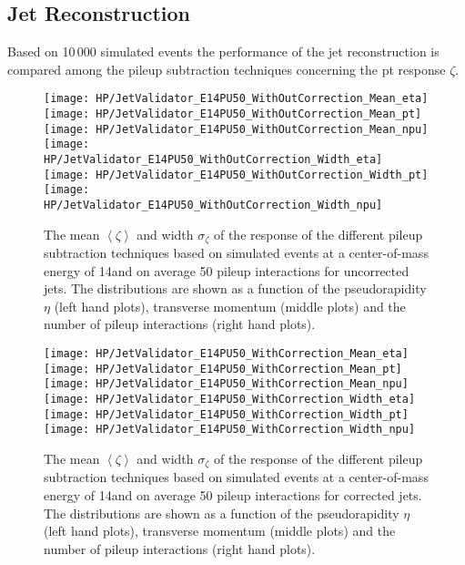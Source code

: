 \subsection{Jet Reconstruction \label{sec:HPUAppE14PU50JR}}

Based on 10\,000 simulated \ttbar events the performance of the jet reconstruction is compared among the pileup subtraction techniques concerning the pt response $\zeta$.

\begin{figure}[!h]
  \centering
  \texttt{[image: HP/JetValidator\_E14PU50\_WithOutCorrection\_Mean\_eta]}
  \texttt{[image: HP/JetValidator\_E14PU50\_WithOutCorrection\_Mean\_pt]}
  \texttt{[image: HP/JetValidator\_E14PU50\_WithOutCorrection\_Mean\_npu]}
  \\
  \centering
  \texttt{[image: HP/JetValidator\_E14PU50\_WithOutCorrection\_Width\_eta]}
  \texttt{[image: HP/JetValidator\_E14PU50\_WithOutCorrection\_Width\_pt]}
  \texttt{[image: HP/JetValidator\_E14PU50\_WithOutCorrection\_Width\_npu]}
  \caption[Mean and width of the \pt{} response for different pileup subtraction techniques based on simulated \ttbar events with 14\TeV and PU=50 for uncorrected jets]{The mean $\left<\zeta\right>$ and width $\sigma_{\zeta}$ of the \pt{} response of the  different pileup subtraction techniques based on simulated \ttbar events at a center-of-mass energy of 14\TeV and on average 50 pileup interactions for uncorrected jets. The distributions are shown as a function of the pseudorapidity $\eta$ (left hand plots), transverse momentum (middle plots) and the number of pileup interactions (right hand plots).}
\end{figure}

\begin{figure}[!h]
  \centering
  \texttt{[image: HP/JetValidator\_E14PU50\_WithCorrection\_Mean\_eta]}
  \texttt{[image: HP/JetValidator\_E14PU50\_WithCorrection\_Mean\_pt]}
  \texttt{[image: HP/JetValidator\_E14PU50\_WithCorrection\_Mean\_npu]}
  \\
  \centering
  \texttt{[image: HP/JetValidator\_E14PU50\_WithCorrection\_Width\_eta]}
  \texttt{[image: HP/JetValidator\_E14PU50\_WithCorrection\_Width\_pt]}
  \texttt{[image: HP/JetValidator\_E14PU50\_WithCorrection\_Width\_npu]}
  \caption[Mean and width of the \pt{} response for different pileup subtraction techniques based on simulated \ttbar events with 14\TeV and PU=50 for corrected jets]{The mean $\left<\zeta\right>$ and width $\sigma_{\zeta}$ of the \pt{} response of the different pileup subtraction techniques based on simulated \ttbar events at a center-of-mass energy of 14\TeV and on average 50 pileup interactions for corrected jets. The distributions are shown as a function of the pseudorapidity $\eta$ (left hand plots), transverse momentum (middle plots) and the number of pileup interactions (right hand plots).}
\end{figure}
\clearpage

